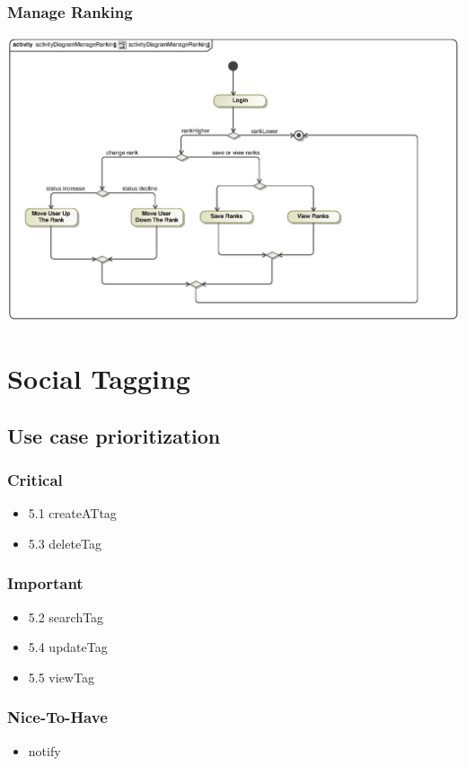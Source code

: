 \documentclass[hidelinks, 12pt, oneside]{article}
\begin{document}
\subsubsection{Manage Ranking}
\includegraphics[scale=.9]{Kgomotso/graphics/activityDiagramManageRanking.eps}\\

\section{Social Tagging}
\subsection{Use case prioritization}
\subsubsection{Critical}
\begin{itemize}
  \item 5.1 createATtag
  \item 5.3 deleteTag
\end{itemize}

\subsubsection{Important}
\begin{itemize}
  \item 5.2 searchTag
  \item 5.4 updateTag
  \item 5.5 viewTag
\end{itemize}
\subsubsection{Nice-To-Have}
\begin{itemize}
  \item notify
\end{itemize}
\end{document}
